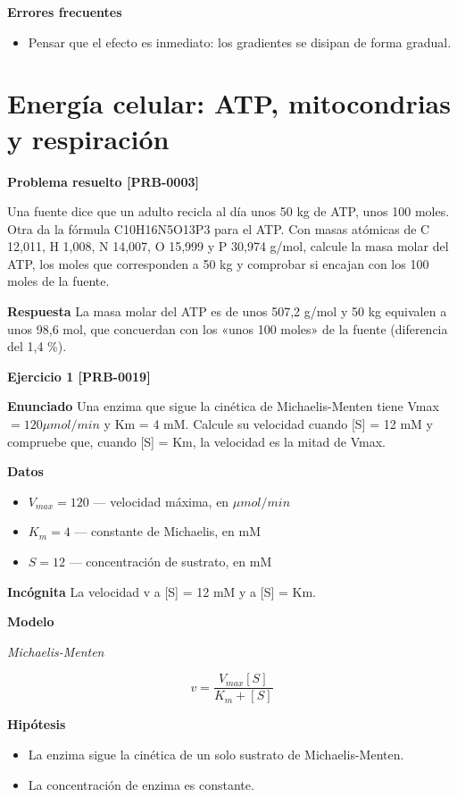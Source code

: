 \documentclass{book}
\begin{document}
\noindent\textbf{Errores frecuentes}
\begin{itemize}
\item Pensar que el efecto es inmediato: los gradientes se disipan de forma gradual.
\end{itemize}

\section{Energía celular: ATP, mitocondrias y respiración}

\noindent\textbf{Problema resuelto [PRB-0003]}

Una fuente dice que un adulto recicla al día unos 50 kg de ATP, unos 100 moles. Otra da la fórmula C10H16N5O13P3 para el ATP. Con masas atómicas de C 12,011, H 1,008, N 14,007, O 15,999 y P 30,974 g/mol, calcule la masa molar del ATP, los moles que corresponden a 50 kg y comprobar si encajan con los 100 moles de la fuente.


\noindent\textbf{Respuesta}
La masa molar del ATP es de unos 507,2 g/mol y 50 kg equivalen a unos 98,6 mol, que concuerdan con los «unos 100 moles» de la fuente (diferencia del 1,4 \%).


\noindent\textbf{Ejercicio 1 [PRB-0019]}

\noindent\textbf{Enunciado}
Una enzima que sigue la cinética de Michaelis-Menten tiene Vmax \(= 120 \mu mol/min\) y Km = 4 mM. Calcule su velocidad cuando [S] = 12 mM y compruebe que, cuando [S] = Km, la velocidad es la mitad de Vmax.


\noindent\textbf{Datos}
\begin{itemize}
\item $V_{max} = 120$ — velocidad máxima, en \(\mu mol/min\)
\item $K_{m} = 4$ — constante de Michaelis, en mM
\item $S = 12$ — concentración de sustrato, en mM
\end{itemize}

\noindent\textbf{Incógnita}
La velocidad v a [S] = 12 mM y a [S] = Km.


\noindent\textbf{Modelo}

\noindent\textit{Michaelis-Menten}

\[
v = \frac{V_{max}[S]}{K_m + [S]}
\]

\noindent\textbf{Hipótesis}
\begin{itemize}
\item La enzima sigue la cinética de un solo sustrato de Michaelis-Menten.
\item La concentración de enzima es constante.
\end{itemize}
\end{document}
